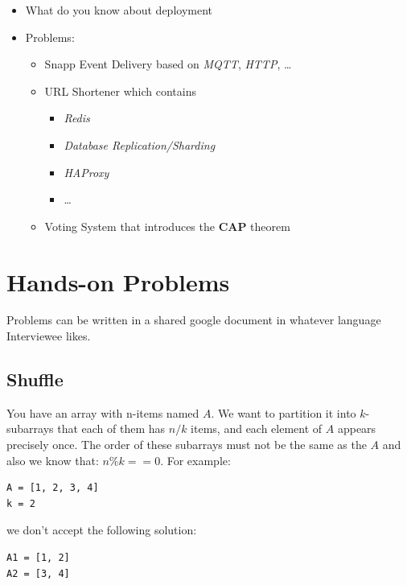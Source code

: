 \documentclass[]{article}
\begin{document}
\begin{multicols}{2}
  \begin{itemize}
    \item What do you know about deployment
    \item Problems:
      \begin{itemize}
        \item Snapp Event Delivery based on \textit{MQTT}, \textit{HTTP}, \ldots
        \item URL Shortener which contains
          \begin{itemize}
            \item \textit{Redis}
            \item \textit{Database Replication/Sharding}
            \item \textit{HAProxy}
            \item \ldots
          \end{itemize}
        \item Voting System that introduces the \textbf{CAP} theorem
      \end{itemize}
  \end{itemize}

\end{multicols}

\section{Hands-on Problems}

Problems can be written in a shared google document in whatever language Interviewee likes.

\subsection{Shuffle}

You have an array with n-items named $A$.
We want to partition it into $k$-subarrays that each of them has $n/k$ items, and each element of $A$ appears precisely once.
The order of these subarrays must not be the same as the $A$ and also we know that: $n \% k == 0$.
For example:

\begin{verbatim}
A = [1, 2, 3, 4]
k = 2
\end{verbatim}

we don't accept the following solution:

\begin{verbatim}
A1 = [1, 2]
A2 = [3, 4]
\end{verbatim}
\end{document}
